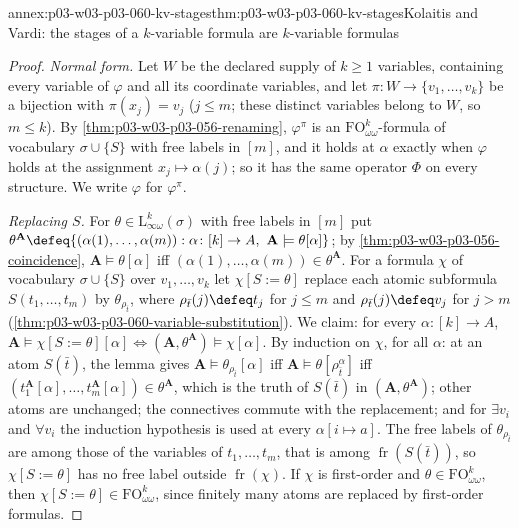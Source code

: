\begin{annexitem}{annex:p03-w03-p03-060-kv-stages}{thm:p03-w03-p03-060-kv-stages}{Kolaitis and Vardi: the stages of a \(k\)-variable formula are \(k\)-variable formulas}
\begin{proof}
\emph{Normal form.} Let \(W\) be the declared supply of \(k\ge1\)
variables, containing every variable of \(\varphi\) and all its coordinate
variables, and let \(\pi\colon W\to\{v_1,\ldots,v_k\}\) be a bijection with
\(\pi(x_j)=v_j\) (\(j\le m\); these distinct variables belong to \(W\),
so \(m\le k\)). By
\cref{thm:p03-w03-p03-056-renaming}, \(\varphi^\pi\) is an
\(\mathrm{FO}^k_{\omega\omega}\)-formula of vocabulary \(\sigma\cup\{S\}\)
with free labels in \([m]\), and it holds at \(\alpha\) exactly when
\(\varphi\) holds at the assignment \(x_j\mapsto\alpha(j)\); so it has the
same operator \(\Phi\) on every structure. We write \(\varphi\) for
\(\varphi^\pi\).

\emph{Replacing \(S\).} For \(\theta\in\mathrm{L}^k_{\infty\omega}(\sigma)\)
with free labels in \([m]\) put
\(\theta^{\mathbf A}\defeq\{(\alpha(1),\ldots,\alpha(m)):\alpha\colon[k]\to A,\ \mathbf A\models\theta[\alpha]\}\);
by \cref{thm:p03-w03-p03-056-coincidence}, \(\mathbf A\models\theta[\alpha]\)
iff \((\alpha(1),\ldots,\alpha(m))\in\theta^{\mathbf A}\). For a formula
\(\chi\) of vocabulary \(\sigma\cup\{S\}\) over \(v_1,\ldots,v_k\) let
\(\chi[S:=\theta]\) replace each atomic subformula \(S(t_1,\ldots,t_m)\) by
\(\theta_{\rho_{\bar t}}\), where \(\rho_{\bar t}(j)\defeq t_j\) for
\(j\le m\) and \(\rho_{\bar t}(j)\defeq v_j\) for \(j>m\)
(\cref{thm:p03-w03-p03-060-variable-substitution}). We claim: for every
\(\alpha\colon[k]\to A\),
\(\mathbf A\models\chi[S:=\theta][\alpha]\iff(\mathbf A,\theta^{\mathbf A})\models\chi[\alpha]\).
By induction on \(\chi\), for all \(\alpha\): at an atom \(S(\bar t)\), the
lemma gives \(\mathbf A\models\theta_{\rho_{\bar t}}[\alpha]\) iff
\(\mathbf A\models\theta[\rho_{\bar t}^\alpha]\) iff
\((t_1^{\mathbf A}[\alpha],\ldots,t_m^{\mathbf A}[\alpha])\in\theta^{\mathbf A}\),
which is the truth of \(S(\bar t)\) in \((\mathbf A,\theta^{\mathbf A})\);
other atoms are unchanged; the connectives commute with the replacement;
and for \(\exists v_i\) and \(\forall v_i\) the induction hypothesis is used
at every \(\alpha[i\mapsto a]\). The free labels of \(\theta_{\rho_{\bar t}}\)
are among those of the variables of \(t_1,\ldots,t_m\), that is among
\(\operatorname{fr}(S(\bar t))\), so \(\chi[S:=\theta]\) has no free label
outside \(\operatorname{fr}(\chi)\). If \(\chi\) is first-order and
\(\theta\in\mathrm{FO}^k_{\omega\omega}\), then
\(\chi[S:=\theta]\in\mathrm{FO}^k_{\omega\omega}\), since finitely many
atoms are replaced by first-order formulas.


\end{proof}
\end{annexitem}
